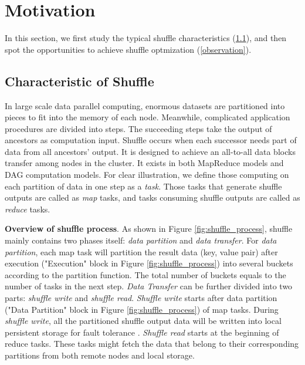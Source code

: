 \section{Motivation}

In this section, we first study the typical shuffle characteristics (\ref{shuffle pattern}), and then spot the opportunities to achieve shuffle optmization (\ref{observation}).
\subsection{Characteristic of Shuffle} \label{shuffle pattern}

In large scale data parallel computing, enormous datasets are partitioned into pieces to fit into the memory of each node.
Meanwhile, complicated application procedures are divided into steps. The succeeding steps take the output of ancestors as computation input. Shuffle occurs when each successor needs
part of data from all ancestors' output. It is designed to achieve an all-to-all data blocks transfer among nodes in the cluster. It exists in both MapReduce models and DAG computation models.
For clear illustration, we define those computing on each partition of data in one step as a \textit{task}.
Those tasks that generate shuffle outputs are called as \textit{map} tasks, and tasks consuming shuffle outputs are called as \textit{reduce} tasks.

\textbf{Overview of shuffle process}. As shown in Figure \ref{fig:shuffle_process}, shuffle mainly contains two phases itself: \textit{data partition} and \textit{data transfer}. For \textit{data partition}, each map task will partition the result data (key, value pair) after execution ("Execution" block in Figure \ref{fig:shuffle_process}) into several buckets according to the partition function.
The total number of buckets equals to the number of tasks in the next step.
\textit{Data Transfer} can be further divided into two parts: \textit{shuffle write} and \textit{shuffle read}. \textit{Shuffle write} starts after data partition ("Data Partition" block in Figure \ref{fig:shuffle_process}) of map tasks.
During \textit{shuffle write}, all the partitioned shuffle output data will be written into local persistent storage for fault tolerance \cite{mapreduce, spark}.
\textit{Shuffle read} starts at the beginning of reduce tasks. These tasks might fetch the data that belong to their corresponding partitions from both remote nodes and local storage.

